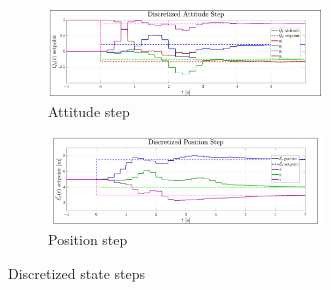 \begin{figure}[htbp]
\centering
\begin{subfigure}{\textwidth}
\centering
\includegraphics[width=0.8\textwidth]{graphs/discrete_attitude_step}
\vspace{-6pt}
\caption{Attitude step}
\end{subfigure}
\begin{subfigure}{\textwidth}
\vspace{-3pt}
\centering
\includegraphics[width=0.8\textwidth]{graphs/discrete_position_step}
\vspace{-6pt}
\caption{Position step}
\end{subfigure}
\vspace{-8pt}
\caption{Discretized state steps}
\label{fig:discrete_step}
\vspace{-12pt}
\end{figure}
\par